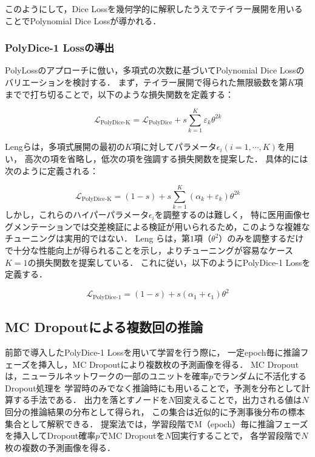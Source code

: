 \documentclass[10pt, a4paper, twocolumn]{jarticle}
\begin{document}
このようにして，Dice Lossを幾何学的に解釈したうえでテイラー展開を用いることでPolynomial Dice Lossが導かれる．


\subsubsection{PolyDice-1 Lossの導出}
PolyLoss\cite{leng2022polyloss}のアプローチに倣い，多項式の次数に基づいてPolynomial Dice Lossのバリエーションを検討する．
まず，テイラー展開で得られた無限級数を第$K$項までで打ち切ることで，以下のような損失関数を定義する：

\begin{equation}
  \mathcal{L}_{\text{PolyDice-K}} = \mathcal{L}_{\text{PolyDice}} + s \sum_{k=1}^{K} \varepsilon_k \theta^{2k}
\end{equation}

Lengら\cite{leng2022polyloss}は，多項式展開の最初の$K$項に対してパラメータ$\epsilon_i(i = 1, \cdots, K)$を用い，
高次の項を省略し，低次の項を強調する損失関数を提案した．
具体的には次のように定義される：

\begin{equation}
  \mathcal{L}_{\text{PolyDice-K}} = (1 - s) + s \sum_{k=1}^{K} (\alpha_k + \varepsilon_k) \theta^{2k}
\end{equation}
%
%
しかし，これらのハイパーパラメータ$\epsilon_i$を調整するのは難しく，
特に医用画像セグメンテーションでは交差検証による検証が用いられるため，このような複雑なチューニングは実用的ではない．
Leng ら\cite{leng2022polyloss}は，第$1$項（$\theta ^ 2$）のみを調整するだけで十分な性能向上が得られることを示し，よりチューニングが容易なケース$K=1$の損失関数を提案している．
これに従い，以下のようにPolyDice-1 Lossを定義する．

\begin{equation}
  \mathcal{L}_{\text{PolyDice-1}} = (1 - s) + s(\alpha_1 + \epsilon_1) \theta^2
\end{equation}

\subsection{MC Dropoutによる複数回の推論}

前節で導入したPolyDice-1 Lossを用いて学習を行う際に，
一定epoch毎に推論フェーズを挿入し，MC Dropoutにより複数枚の予測画像を得る．
MC Dropoutは，ニューラルネットワークの一部のユニットを確率$p$でランダムに不活化するDropout処理を
学習時のみでなく推論時にも用いることで，予測を分布として計算する手法である．
出力を落とすノードを$N$回変えることで，出力される値は$N$回分の推論結果の分布として得られ，
この集合は近似的に予測事後分布の標本集合として解釈できる．
提案法では，学習段階でM（epoch）毎に推論フェーズを挿入してDropout確率$p$でMC Dropoutを$N$回実行することで，
各学習段階で$N$枚の複数の予測画像を得る．
\end{document}
